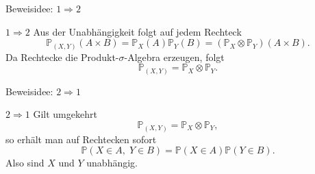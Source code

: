 \documentclass{beamer}
\begin{document}
\begin{frame}{Beweisidee: \(1\Rightarrow 2\)}
\begin{block}{\(1\Rightarrow 2\)}
Aus der Unabhängigkeit folgt auf jedem Rechteck
\[
\mathbb P_{(X,Y)}(A\times B)
=
\mathbb P_X(A)\mathbb P_Y(B)
=
(\mathbb P_X\otimes\mathbb P_Y)(A\times B).
\]
Da Rechtecke die Produkt-\(\sigma\)-Algebra erzeugen, folgt
\[
\mathbb P_{(X,Y)}=\mathbb P_X\otimes\mathbb P_Y.
\]
\end{block}
\end{frame}

\begin{frame}{Beweisidee: \(2\Rightarrow 1\)}
\begin{block}{\(2\Rightarrow 1\)}
Gilt umgekehrt
\[
\mathbb P_{(X,Y)}=\mathbb P_X\otimes\mathbb P_Y,
\]
so erhält man auf Rechtecken sofort
\[
\mathbb P(X\in A,\;Y\in B)=\mathbb P(X\in A)\mathbb P(Y\in B).
\]
Also sind \(X\) und \(Y\) unabhängig.
\end{block}
\end{frame}
\end{document}
